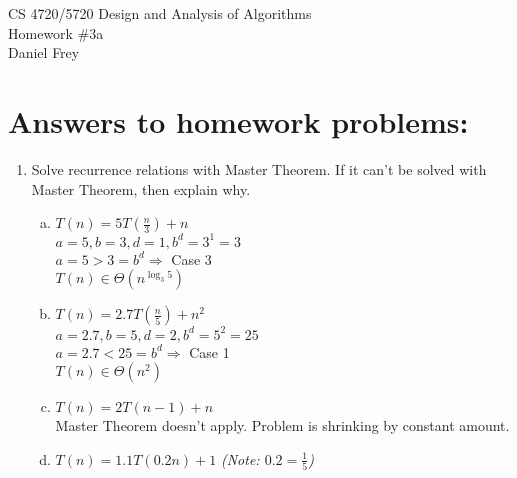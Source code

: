 \documentclass[11pt]{article}
\begin{document}
 

\rhead{\today}

\begin{center}\begin{Large}
CS 4720/5720 Design and Analysis of Algorithms \\
Homework \#3a \\
Daniel Frey
\end{Large}
\end{center}

\section*{Answers to homework problems:}

\begin{enumerate}
	\item
		 Solve recurrence relations with Master Theorem. If it can't be solved with Master Theorem, then explain why. 
		\begin{enumerate}[(a)]
			\item
				$ T(n) = 5T(\frac{n}{3}) + n $ \\
					\hspace*{.4cm}
					$ a=5, b=3, d=1, b^d=3^1=3 $ \\
					\hspace*{.4cm}
					$ a=5 > 3=b^d \Rightarrow $ Case 3 \\
					\hspace*{.4cm}
					$ T(n) \in \Theta(n^{\log_3 5}) $ \\
			\item
				$ T(n) = 2.7T(\frac{n}{5}) + n^2 $ \\
					\hspace*{.4cm}
					$ a=2.7, b=5, d=2, b^d=5^2=25 $ \\
					\hspace*{.4cm}
					$ a=2.7 < 25=b^d \Rightarrow $ Case 1 \\
					\hspace*{.4cm}
					$ T(n) \in \Theta(n^2) $ \\
			\item
				$ T(n) = 2T(n-1) + n $ \\
					Master Theorem doesn't apply. Problem is shrinking by constant amount. \\
			\item
				$ T(n) = 1.1T(0.2n) + 1 $ 
				\hspace*{.4cm} \textit{(Note: $ 0.2=\frac{1}{5} $)} \\

\end{enumerate}
\end{enumerate}
\end{document}
